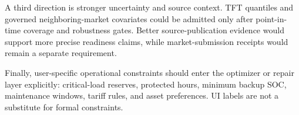 A third direction is stronger uncertainty and source context. TFT quantiles and governed neighboring-market covariates could be admitted only after point-in-time coverage and robustness gates. Better source-publication evidence would support more precise readiness claims, while market-submission receipts would remain a separate requirement.

Finally, user-specific operational constraints should enter the optimizer or repair layer explicitly: critical-load reserves, protected hours, minimum backup SOC, maintenance windows, tariff rules, and asset preferences. UI labels are not a substitute for formal constraints.
